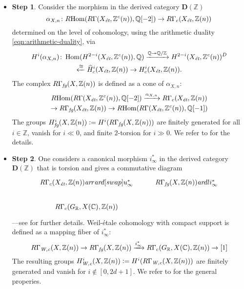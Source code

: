 \documentclass[draft]{article}
\DeclareMathOperator{\Hom}{Hom}
\newcommand{\CC}{\mathbb{C}}
\newcommand{\QQ}{\mathbb{Q}}
\newcommand{\RR}{\mathbb{R}}
\newcommand{\ZZ}{\mathbb{Z}}
\newcommand{\ar}{\text{\it ar}}
\newcommand{\et}{\text{\it \'{e}t}}
\newcommand{\fg}{\text{\it fg}}
\newcommand{\Wc}{\text{\it W,c}}
\newcommand{\dfn}{\mathrel{\mathop:}=}
\newcommand{\RHom}{R\!\Hom}
\theoremstyle{myplain}
\theoremstyle{mydefinition}
\numberwithin{equation}{section}
\begin{document}
\begin{itemize}
\item \textbf{Step 1}. Consider the morphism in the derived category
  $\mathbf{D} (\ZZ)$
  \[ \alpha_{X,n}\colon \RHom (R\Gamma (X_\et, \ZZ^c(n)), \QQ [-2]) \to
    R\Gamma_c (X_\et, \ZZ(n)) \]
  determined on the level of cohomology, using the arithmetic duality
  \eqref{eqn:arithmetic-duality}, via
  \begin{multline}
    \label{eqn:alpha-X-n-cohomology}
    H^i (\alpha_{X,n})\colon \Hom (H^{2-i} (X_\et, \ZZ^c(n)), \QQ)
    \xrightarrow{\QQ \twoheadrightarrow \QQ/\ZZ}
    H^{2-i} (X_\et, \ZZ^c(n))^D \\
    \xleftarrow{\cong} \widehat{H}^i_c (X_\et, \ZZ(n)) \to
    H^i_c (X_\et, \ZZ(n)).
  \end{multline}
  The complex $R\Gamma_\fg (X, \ZZ(n))$ is defined as a cone of
  $\alpha_{X,n}$:
  \begin{multline*}
    \RHom (R\Gamma (X_\et, \ZZ^c(n)), \QQ [-2]) \xrightarrow{\alpha_{X,n}}
    R\Gamma_c (X_\et, \ZZ(n)) \\
    \to R\Gamma_\fg (X_\et, \ZZ(n)) \to \RHom (R\Gamma (X_\et, \ZZ^c(n)), \QQ [-1])
  \end{multline*}
  The groups $H^i_\fg (X, \ZZ(n)) \dfn H^i (R\Gamma_\fg (X, \ZZ(n)))$ are
  finitely generated for all $i \in \ZZ$, vanish for $i \ll 0$, and finite
  $2$-torsion for $i \gg 0$.  We refer to \cite[\S 5]{Beshenov-Weil-etale-1} for
  the details.

\item \textbf{Step 2}. One considers a canonical morphism $i^*_\infty$ in the
  derived category $\mathbf{D} (\ZZ)$ that is torsion and gives a commutative
  diagram
  \[ \begin{tikzcd}
      R\Gamma_c (X_\et, \ZZ(n)) \ar{r}\ar{d}[swap]{u^*_\infty} & R\Gamma_\fg (X, \ZZ(n)) \ar{dl}{i^*_\infty} \\
      R\Gamma_c (G_\RR, X(\CC), \ZZ(n))
    \end{tikzcd} \]
  ---see \cite[\S\S 6,7]{Beshenov-Weil-etale-1} for further details.
  Weil-\'{e}tale cohomology with compact support is defined as a mapping fiber of
  $i^*_\infty$:
  \[ R\Gamma_\Wc (X, \ZZ(n)) \to
    R\Gamma_\fg (X, \ZZ(n)) \xrightarrow{i^*_\infty}
    R\Gamma_c (G_\RR, X(\CC), \ZZ(n)) \to [1] \]
  The resulting groups $H^i_\Wc (X, \ZZ(n)) \dfn H^i (R\Gamma_\Wc (X, \ZZ(n)))$
  are finitely generated and vanish for $i \notin [0,2d+1]$. We refer to
  \cite[\S 7]{Beshenov-Weil-etale-1} for the general properies.
\end{itemize}
\end{document}
